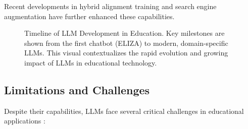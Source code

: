 Recent developments in hybrid alignment training \cite{openreview2024llm} and search engine augmentation \cite{vu2024freshllms} have further enhanced these capabilities.

\begin{figure}[ht]
    \centering
    \caption{Timeline of LLM Development in Education. Key milestones are shown from the first chatbot (ELIZA) to modern, domain-specific LLMs. This visual contextualizes the rapid evolution and growing impact of LLMs in educational technology.}
    \label{fig:llm-timeline}
\end{figure}


\subsection{Limitations and Challenges}
Despite their capabilities, LLMs face several critical challenges in educational applications \cite{zhang2024survey}:

